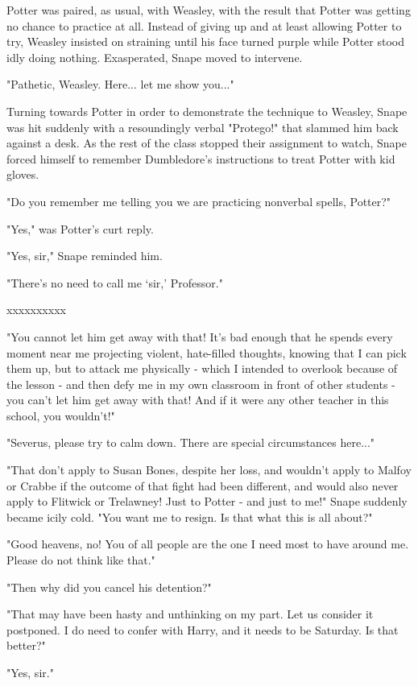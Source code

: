 \documentclass[a4paper,11pt]{article}
\begin{document}
Potter was paired, as usual, with Weasley, with the result that Potter was getting no chance to practice at all. Instead of giving up and at least allowing Potter to try, Weasley insisted on straining until his face turned purple while Potter stood idly doing nothing. Exasperated, Snape moved to intervene.

"Pathetic, Weasley. Here... let me show you..."

Turning towards Potter in order to demonstrate the technique to Weasley, Snape was hit suddenly with a resoundingly verbal "Protego!" that slammed him back against a desk. As the rest of the class stopped their assignment to watch, Snape forced himself to remember Dumbledore's instructions to treat Potter with kid gloves.

"Do you remember me telling you we are practicing nonverbal spells, Potter?"

"Yes," was Potter's curt reply.

"Yes, sir," Snape reminded him.

"There's no need to call me `sir,' Professor."

xxxxxxxxxx

"You cannot let him get away with that! It's bad enough that he spends every moment near me projecting violent, hate-filled thoughts, knowing that I can pick them up, but to attack me physically - which I intended to overlook because of the lesson - and then defy me in my own classroom in front of other students - you can't let him get away with that! And if it were any other teacher in this school, you wouldn't!"

"Severus, please try to calm down. There are special circumstances here..."

"That don't apply to Susan Bones, despite her loss, and wouldn't apply to Malfoy or Crabbe if the outcome of that fight had been different, and would also never apply to Flitwick or Trelawney! Just to Potter - and just to me!" Snape suddenly became icily cold. "You want me to resign. Is that what this is all about?"

"Good heavens, no! You of all people are the one I need most to have around me. Please do not think like that."

"Then why did you cancel his detention?"

"That may have been hasty and unthinking on my part. Let us consider it postponed. I do need to confer with Harry, and it needs to be Saturday. Is that better?"

"Yes, sir."
\end{document}
